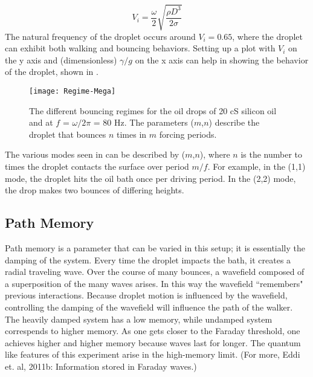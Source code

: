 \begin{equation} \label{vibrationnumber}
V_i = \frac{\omega}{2}\sqrt{\frac{\rho D^3}{2\sigma}}
\end{equation}   	       	       
	       	       The natural frequency of the droplet occurs around $V_i = 0.65$, where the droplet can exhibit both walking and bouncing behaviors. Setting up a plot with $V_i$ on the y axis and (dimensionless) ${\gamma}/{g}$ on the x axis can help in showing the behavior of the droplet, shown in . 
	    
	    \begin{figure}[h]
	   
	       \centering
	    \texttt{[image: Regime-Mega]}
	     \caption{The different bouncing regimes for the oil drops of 20 cS silicon oil and at $f$ = $\omega / 2\pi$ = 80 Hz. The parameters ($m$,$n$) describe the droplet that bounces $n$ times in $m$ forcing periods. }
	 \label{regime}
	\end{figure}

The various modes seen in  can be described by ($m$,$n$), where $n$ is the number to times the droplet contacts the surface over period $m/f$. For example, in the (1,1) mode, the droplet hits the oil bath once per driving period. In the (2,2) mode, the drop makes two bounces of differing heights. 
	       
            \subsection{Path Memory}
                        
            Path memory is a parameter that can be varied in this setup; it is essentially the damping of the system. Every time the droplet impacts the bath, it creates a radial traveling wave. Over the course of many bounces, a wavefield composed of a superposition of the many waves arises. In this way the wavefield ``remembers" previous interactions. Because droplet motion is influenced by the wavefield, controlling the damping of the wavefield will influence the path of the walker. The heavily damped system has a low memory, while undamped system correspends to higher memory. As one gets closer to the Faraday threshold, one achieves higher and higher memory because waves last for longer. The quantum like features of this experiment arise in the high-memory limit. (For more, Eddi et. al, 2011b: Information stored in Faraday waves.) 
            
